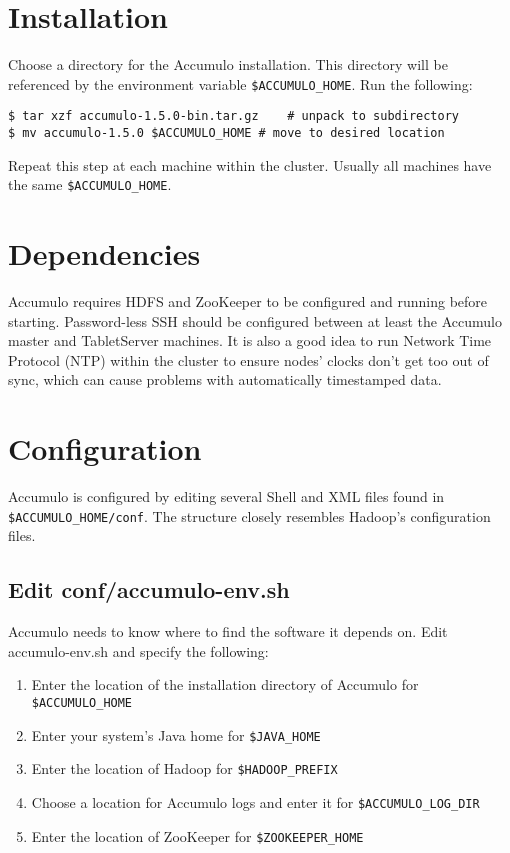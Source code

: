 \section{Installation}
Choose a directory for the Accumulo installation. This directory will be referenced
by the environment variable \texttt{\$ACCUMULO\_HOME}. Run the following:

\small
\begin{verbatim}
$ tar xzf accumulo-1.5.0-bin.tar.gz    # unpack to subdirectory
$ mv accumulo-1.5.0 $ACCUMULO_HOME # move to desired location
\end{verbatim}
\normalsize

Repeat this step at each machine within the cluster. Usually all machines have the
same \texttt{\$ACCUMULO\_HOME}.

\section{Dependencies}
Accumulo requires HDFS and ZooKeeper to be configured and running
before starting. Password-less SSH should be configured between at least the
Accumulo master and TabletServer machines. It is also a good idea to run Network
Time Protocol (NTP) within the cluster to ensure nodes' clocks don't get too out of
sync, which can cause problems with automatically timestamped data. 

\section{Configuration}

Accumulo is configured by editing several Shell and XML files found in
\texttt{\$ACCUMULO\_HOME/conf}. The structure closely resembles Hadoop's configuration
files.

\subsection{Edit conf/accumulo-env.sh}

Accumulo needs to know where to find the software it depends on. Edit accumulo-env.sh 
and specify the following:

\begin{enumerate}
\item{Enter the location of the installation directory of Accumulo for \texttt{\$ACCUMULO\_HOME}}
\item{Enter your system's Java home for \texttt{\$JAVA\_HOME}}
\item{Enter the location of Hadoop for \texttt{\$HADOOP\_PREFIX}}
\item{Choose a location for Accumulo logs and enter it for \texttt{\$ACCUMULO\_LOG\_DIR}}
\item{Enter the location of ZooKeeper for \texttt{\$ZOOKEEPER\_HOME}}
\end{enumerate}

